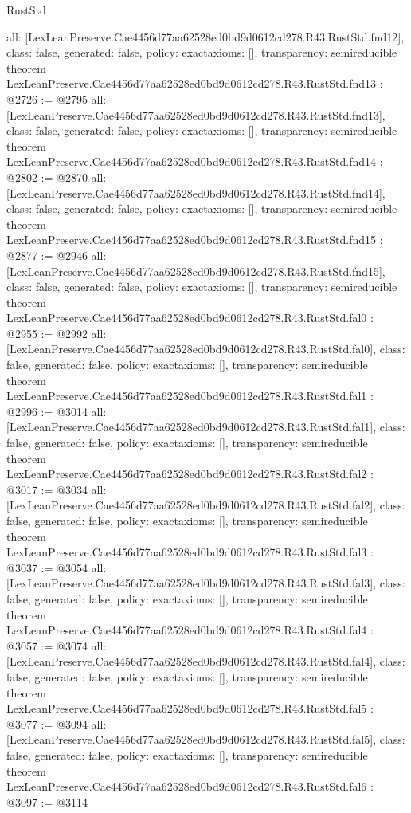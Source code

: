 \begin{lexlean}{RustStd}
\begin{coremodule}
{  all: [LexLeanPreserve.Cae4456d77aa62528ed0bd9d0612cd278.R43.RustStd.fnd12],
  class: false,
  generated: false,
  policy: exact{axioms: []},
  transparency: semireducible
}
theorem LexLeanPreserve.Cae4456d77aa62528ed0bd9d0612cd278.R43.RustStd.fnd13 : @2726 := @2795 {
  all: [LexLeanPreserve.Cae4456d77aa62528ed0bd9d0612cd278.R43.RustStd.fnd13],
  class: false,
  generated: false,
  policy: exact{axioms: []},
  transparency: semireducible
}
theorem LexLeanPreserve.Cae4456d77aa62528ed0bd9d0612cd278.R43.RustStd.fnd14 : @2802 := @2870 {
  all: [LexLeanPreserve.Cae4456d77aa62528ed0bd9d0612cd278.R43.RustStd.fnd14],
  class: false,
  generated: false,
  policy: exact{axioms: []},
  transparency: semireducible
}
theorem LexLeanPreserve.Cae4456d77aa62528ed0bd9d0612cd278.R43.RustStd.fnd15 : @2877 := @2946 {
  all: [LexLeanPreserve.Cae4456d77aa62528ed0bd9d0612cd278.R43.RustStd.fnd15],
  class: false,
  generated: false,
  policy: exact{axioms: []},
  transparency: semireducible
}
theorem LexLeanPreserve.Cae4456d77aa62528ed0bd9d0612cd278.R43.RustStd.fal0 : @2955 := @2992 {
  all: [LexLeanPreserve.Cae4456d77aa62528ed0bd9d0612cd278.R43.RustStd.fal0],
  class: false,
  generated: false,
  policy: exact{axioms: []},
  transparency: semireducible
}
theorem LexLeanPreserve.Cae4456d77aa62528ed0bd9d0612cd278.R43.RustStd.fal1 : @2996 := @3014 {
  all: [LexLeanPreserve.Cae4456d77aa62528ed0bd9d0612cd278.R43.RustStd.fal1],
  class: false,
  generated: false,
  policy: exact{axioms: []},
  transparency: semireducible
}
theorem LexLeanPreserve.Cae4456d77aa62528ed0bd9d0612cd278.R43.RustStd.fal2 : @3017 := @3034 {
  all: [LexLeanPreserve.Cae4456d77aa62528ed0bd9d0612cd278.R43.RustStd.fal2],
  class: false,
  generated: false,
  policy: exact{axioms: []},
  transparency: semireducible
}
theorem LexLeanPreserve.Cae4456d77aa62528ed0bd9d0612cd278.R43.RustStd.fal3 : @3037 := @3054 {
  all: [LexLeanPreserve.Cae4456d77aa62528ed0bd9d0612cd278.R43.RustStd.fal3],
  class: false,
  generated: false,
  policy: exact{axioms: []},
  transparency: semireducible
}
theorem LexLeanPreserve.Cae4456d77aa62528ed0bd9d0612cd278.R43.RustStd.fal4 : @3057 := @3074 {
  all: [LexLeanPreserve.Cae4456d77aa62528ed0bd9d0612cd278.R43.RustStd.fal4],
  class: false,
  generated: false,
  policy: exact{axioms: []},
  transparency: semireducible
}
theorem LexLeanPreserve.Cae4456d77aa62528ed0bd9d0612cd278.R43.RustStd.fal5 : @3077 := @3094 {
  all: [LexLeanPreserve.Cae4456d77aa62528ed0bd9d0612cd278.R43.RustStd.fal5],
  class: false,
  generated: false,
  policy: exact{axioms: []},
  transparency: semireducible
}
theorem LexLeanPreserve.Cae4456d77aa62528ed0bd9d0612cd278.R43.RustStd.fal6 : @3097 := @3114 {
}
\end{coremodule}
\end{lexlean}
